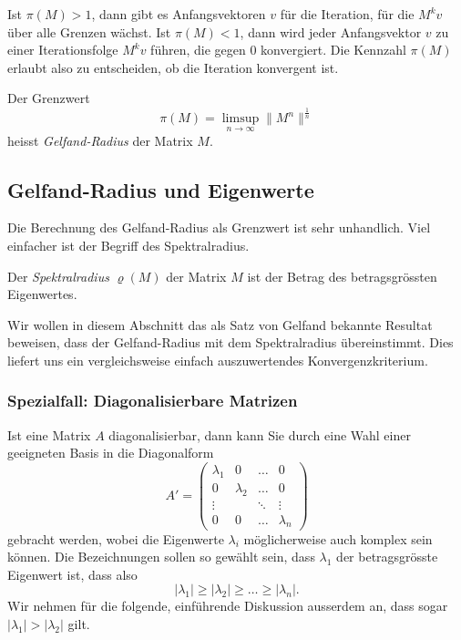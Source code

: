 Ist $\pi(M) > 1$, dann gibt es Anfangsvektoren $v$ für die Iteration,
für die $M^kv$ über alle Grenzen wächst.
Ist $\pi(M) < 1$, dann wird jeder Anfangsvektor $v$ zu einer Iterationsfolge
$M^kv$ führen, die gegen $0$ konvergiert.
Die Kennzahl $\pi(M)$ erlaubt also zu entscheiden, ob die
Iteration konvergent ist.
%

\begin{definition}
\label{buch:eigenwerte:def:gelfand-radius}
Der Grenzwert
\[
\pi(M)
=
\limsup_{n\to\infty} \|M^n\|^{\frac1n}
\]
heisst {\em Gelfand-Radius} der Matrix $M$.
%
\end{definition}


%
%
\subsection{Gelfand-Radius und Eigenwerte
\label{buch:subsection:potenzreihen}}
Die Berechnung des Gelfand-Radius als Grenzwert ist sehr unhandlich.
Viel einfacher ist der Begriff des Spektralradius.
%

\begin{definition}
\label{buch:definition:spektralradius}
Der {\em Spektralradius} $\varrho(M)$ der Matrix $M$ ist der Betrag des
betragsgrössten
%
Eigenwertes.
%
\end{definition}

Wir wollen in diesem Abschnitt das als Satz von Gelfand bekannte Resultat
beweisen, dass der Gelfand-Radius mit dem Spektralradius übereinstimmt.
Dies liefert uns ein vergleichsweise einfach auszuwertendes Konvergenzkriterium.
%

\subsubsection{Spezialfall: Diagonalisierbare Matrizen}
Ist eine Matrix $A$ diagonalisierbar, dann kann Sie durch eine Wahl
einer geeigneten Basis in die Diagonalform
%
%
\[
A'
=
\begin{pmatrix}
\lambda_1&        0&\dots &0\\
0        &\lambda_2&\dots &0\\
\vdots   &         &\ddots&\vdots\\
0        &        0&\dots &\lambda_n
\end{pmatrix}
\]
gebracht werden, wobei die Eigenwerte $\lambda_i$  möglicherweise auch
komplex sein können.
%
Die Bezeichnungen sollen so gewählt sein, dass $\lambda_1$ der
betragsgrösste Eigenwert ist, dass also
\[
|\lambda_1| \ge |\lambda_2| \ge \dots \ge |\lambda_n|.
\]
Wir nehmen für die folgende, einführende Diskussion ausserdem an, dass
sogar $|\lambda_1|>|\lambda_2|$ gilt.


